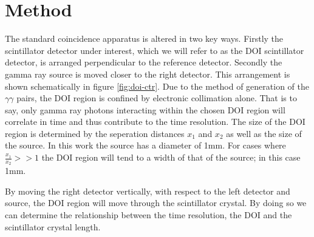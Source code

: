 \section{Method}
The standard coincidence apparatus is altered in two key ways. Firstly the scintillator detector under interest, which we will refer to as the DOI scintillator detector, is arranged perpendicular to the reference detector. Secondly the gamma ray source is moved closer to the right detector. This arrangement is shown schematically in figure 
\ref{fig:doi-ctr}. Due to the method of generation of the $\gamma\gamma$ pairs, the DOI region is confined by electronic collimation alone. That is to say, only gamma ray photons interacting within the chosen DOI region will correlate in time and thus  contribute to the time resolution. The size of the DOI region is determined by the seperation distances $x_1$ and $x_2$ as well as the size of the source. In this work the source has a diameter of 1mm. For cases where $\frac{x_1}{x_2}>>1$ the DOI region will tend to a width of that of the source; in this case 1mm.

By moving the right detector vertically, with respect to the left detector and source, the DOI region will move through the scintillator crystal. By doing so we can determine the relationship between the time resolution, the DOI and the scintillator crystal length.